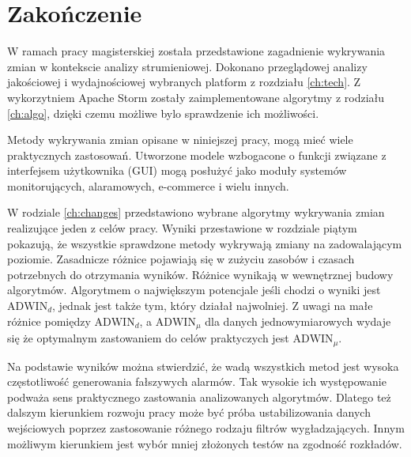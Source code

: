 \chapter{Zakończenie}
W ramach pracy magisterskiej została przedstawione zagadnienie wykrywania zmian w kontekscie analizy strumieniowej.
Dokonano przeglądowej analizy jakościowej i wydajnościowej wybranych platform z rozdziału \ref{ch:tech}.
Z wykorzytniem Apache Storm zostały zaimplementowane algorytmy z rodziału \ref{ch:algo},
dzięki czemu możliwe bylo sprawdzenie ich możliwości.

Metody wykrywania zmian opisane w niniejszej pracy,
mogą mieć wiele praktycznych zastosowań.
Utworzone modele wzbogacone o funkcji związane z interfejsem użytkownika (GUI) mogą posłużyć
jako moduły systemów monitorujących, alaramowych, e-commerce i wielu innych.

W rodziale \ref{ch:changes} przedstawiono wybrane algorytmy wykrywania zmian realizujące jeden z celów pracy.
Wyniki przestawione w rozdziale piątym pokazują,
że wszystkie sprawdzone metody wykrywają zmiany na zadowalającym poziomie.
Zasadnicze różnice pojawiają się w zużyciu zasobów i czasach potrzebnych do otrzymania wyników.
Różnice wynikają w wewnętrznej budowy algorytmów.
Algorytmem o największym potencjale jeśli chodzi o wyniki jest $\mbox{ADWIN}_d$,
jednak jest także tym, który działał najwolniej.
Z uwagi na małe różnice pomiędzy $\mbox{ADWIN}_d$, a $\mbox{ADWIN}_\mu$ dla danych jednowymiarowych
wydaje się że optymalnym zastowaniem do celów praktyczych jest $\mbox{ADWIN}_\mu$.

Na podstawie wyników można stwierdzić,
że wadą wszystkich metod jest wysoka częstotliwość generowania fałszywych alarmów.
Tak wysokie ich występowanie podważa sens praktycznego zastowania analizowanych algorytmów.
Dlatego też dalszym kierunkiem rozwoju pracy może być próba ustabilizowania danych wejściowych
poprzez zastosowanie różnego rodzaju filtrów wygładzających.
Innym możliwym kierunkiem jest wybór mniej złożonych testów na zgodność rozkładów.
